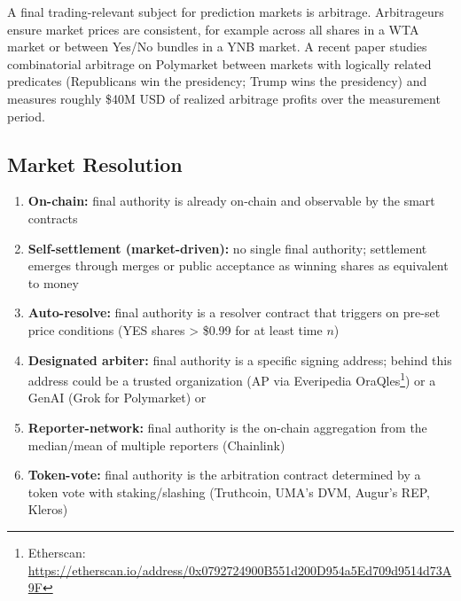 A final trading-relevant subject for prediction markets is arbitrage. Arbitrageurs ensure market prices are consistent, for example across all shares in a WTA market or between Yes/No bundles in a YNB market. A recent paper studies combinatorial arbitrage on Polymarket between markets with logically related predicates (\eg Republicans win the presidency; Trump wins the presidency) and measures roughly \$40M USD of realized arbitrage profits over the measurement period. 


\subsection{Market Resolution}\label{wf:close}



\begin{enumerate}
  \item \textbf{On-chain:} final authority is already on-chain and observable by the \depm smart contracts %
  \item \textbf{Self-settlement (market-driven):} no single final authority; settlement emerges through merges or public acceptance as winning shares as equivalent to money %
  \item \textbf{Auto-resolve:} final authority is a resolver contract that triggers on pre-set price conditions (\eg YES shares > \$0.99 for at least time $n$) 
  \item \textbf{Designated arbiter:} final authority is a specific signing address; behind this address could be a trusted organization (\eg AP via Everipedia OraQles\footnote{Etherscan: \url{https://etherscan.io/address/0x0792724900B551d200D954a5Ed709d9514d73A9F}}) or a GenAI (\eg Grok for Polymarket)  or 
  \item \textbf{Reporter-network:} final authority is the on-chain aggregation from the median/mean of multiple reporters (\eg Chainlink)
  \item \textbf{Token-vote:} final authority is the arbitration contract determined by a token vote with staking/slashing (\eg Truthcoin, UMA's DVM, Augur's REP, Kleros) 

\end{enumerate}

